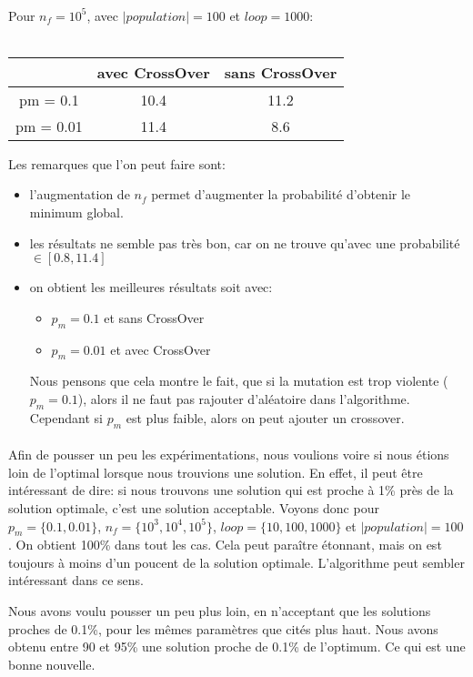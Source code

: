 \documentclass[a4paper, 11pt]{article}
\begin{document}
\paragraph{}
Pour $n_f = 10^5$, avec $|population| = 100$ et $loop = 1000$:\\
\\
\begin{tabular}{|c|c|c|}
 \hline
  & avec CrossOver & sans CrossOver\\
  \hline
  pm = 0.1 & 10.4 & 11.2\\
  \hline
  pm = 0.01 & 11.4 & 8.6 \\
  \hline
\end{tabular}

Les remarques que l'on peut faire sont:
\begin{itemize}
 \item l'augmentation de $n_f$ permet d'augmenter la probabilité d'obtenir le minimum global.
 \item les résultats ne semble pas très bon, car on ne trouve qu'avec une probabilité $\in [0.8,11.4]$
 \item on obtient les meilleures résultats soit avec:
 \begin{itemize}
  \item $p_m=0.1$ et sans CrossOver
  \item $p_m=0.01$ et avec CrossOver
 \end{itemize}
  Nous pensons que cela montre le fait, que si la mutation est trop violente ($p_m=0.1$), alors il ne faut pas rajouter d'aléatoire dans
  l'algorithme. Cependant si $p_m$ est plus faible, alors on peut ajouter un crossover. 
\end{itemize}

\paragraph{}
Afin de pousser un peu les expérimentations, nous voulions voire si nous étions loin de l'optimal lorsque nous trouvions une solution.
En effet, il peut être intéressant de dire: si nous trouvons une solution qui est proche à 1\% près de la solution optimale, c'est une 
solution acceptable.
Voyons donc pour $p_m = \{0.1,0.01\}$, $n_f = \{10^3,10^4,10^5\}$, $loop = \{10,100,1000\}$ et $|population| = 100$.
On obtient 100\% dans tout les cas. 
Cela peut paraître étonnant, mais on est toujours à moins d'un poucent de la solution optimale. L'algorithme peut sembler intéressant 
dans ce sens.

Nous avons voulu pousser un peu plus loin, en n'acceptant que les solutions proches de 0.1\%, pour les mêmes paramètres que cités plus 
haut. Nous avons obtenu entre 90 et 95\% une solution proche de 0.1\% de l'optimum. Ce qui est une bonne nouvelle.
\end{document}
